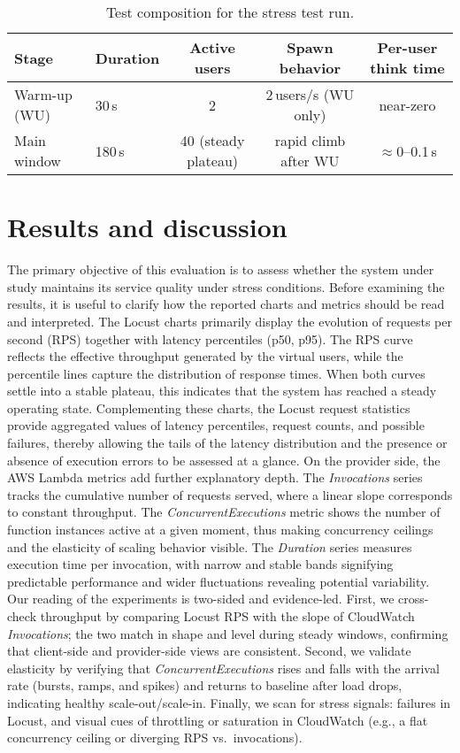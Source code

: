 \documentclass[11pt,a4paper]{article}
\begin{document}
\begin{table}[h]
\centering
\small
\caption{Test composition for the stress test run.}
\label{tab:hhA-plan}
\begin{tabular}{llccc}
\toprule
Stage & Duration & Active users & Spawn behavior & Per-user think time \\
\midrule
Warm-up (WU) & 30\,s  & 2 & 2\,users/s (WU only) & near-zero \\
Main window  & 180\,s & 40 (steady plateau) & rapid climb after WU & $\approx$0--0.1\,s \\
\bottomrule
\end{tabular}
\end{table}

\section{Results and discussion}
The primary objective of this evaluation is to assess whether the system under study maintains its service quality under stress conditions. 
Before examining the results, it is useful to clarify how the reported charts and metrics should be read and interpreted. The Locust charts primarily display the evolution of requests per second (RPS) together with latency percentiles (p50, p95). The RPS curve reflects the effective throughput generated by the virtual users, while the percentile lines capture the distribution of response times. When both curves settle into a stable plateau, this indicates that the system has reached a steady operating state.
Complementing these charts, the Locust request statistics provide aggregated values of latency percentiles, request counts, and possible failures, thereby allowing the tails of the latency distribution and the presence or absence of execution errors to be assessed at a glance. On the provider side, the AWS Lambda metrics add further explanatory depth. The \emph{Invocations} series tracks the cumulative number of requests served, where a linear slope corresponds to constant throughput. The \emph{ConcurrentExecutions} metric shows the number of function instances active at a given moment, thus making concurrency ceilings and the elasticity of scaling behavior visible. The \emph{Duration} series measures execution time per invocation, with narrow and stable bands signifying predictable performance and wider fluctuations revealing potential variability. 
Our reading of the experiments is two-sided and evidence-led. First, we cross-check throughput by comparing Locust RPS with the slope of CloudWatch \emph{Invocations}; the two match in shape and level during steady windows, confirming that client-side and provider-side views are consistent. Second, we validate elasticity by verifying that \emph{ConcurrentExecutions} rises and falls with the arrival rate (bursts, ramps, and spikes) and returns to baseline after load drops, indicating healthy scale-out/scale-in. Finally, we scan for stress signals: failures in Locust, and visual cues of throttling or saturation in CloudWatch (e.g., a flat concurrency ceiling or diverging RPS vs.\ invocations).
\end{document}
